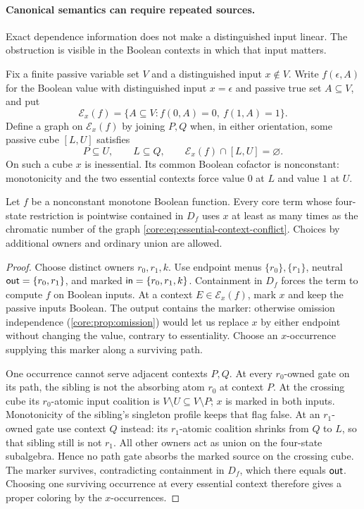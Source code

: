 \paragraph{Canonical semantics can require repeated sources.}
Exact dependence information does not make a distinguished input linear.
The obstruction is visible in the Boolean contexts in which that input
matters.

Fix a finite passive variable set $V$ and a distinguished input $x\notin V$.
Write $f(\epsilon,A)$ for the Boolean value with distinguished input
$x=\epsilon$ and passive true set $A\subseteq V$, and put
\[
 \mathcal E_x(f)=\{A\subseteq V:f(0,A)=0,\ f(1,A)=1\}.
\]
Define a graph on $\mathcal E_x(f)$ by joining $P,Q$ when, in either
orientation, some passive cube $[L,U]$ satisfies
\begin{equation}\label{core:eq:essential-context-conflict}
 P\subseteq U,\qquad L\subseteq Q,\qquad
 \mathcal E_x(f)\cap[L,U]=\varnothing.
\end{equation}
On such a cube $x$ is inessential. Its common Boolean cofactor is
nonconstant: monotonicity and the two essential contexts force value
$0$ at $L$ and value $1$ at $U$.

\begin{proposition}
\label{core:prop:essential-context-coloring}
Let $f$ be a nonconstant monotone Boolean function. Every core term whose
four-state restriction is pointwise contained in $D_f$ uses $x$ at least
as many times as the chromatic number of the graph
\eqref{core:eq:essential-context-conflict}. Choices by additional owners
and ordinary union are allowed.
\end{proposition}
\begin{proof}
Choose distinct owners $r_0,r_1,k$. Use endpoint menus
$\{r_0\},\{r_1\}$, neutral $\mathsf{out}=\{r_0,r_1\}$, and
marked $\mathsf{in}=\{r_0,r_1,k\}$. Containment in $D_f$
forces the term to compute $f$ on Boolean inputs. At a context
$E\in\mathcal E_x(f)$, mark $x$ and keep the passive inputs Boolean.
The output contains the marker: otherwise omission independence
(\cref{core:prop:omission}) would
let us replace $x$ by either endpoint without changing the value,
contrary to essentiality. Choose an $x$-occurrence supplying this marker
along a surviving path.

One occurrence cannot serve adjacent contexts $P,Q$. At every
$r_0$-owned gate on its path, the sibling is not the absorbing atom $r_0$
at context $P$. At the crossing cube its $r_0$-atomic input coalition is
$V\setminus U\subseteq V\setminus P$; $x$ is marked in both inputs.
Monotonicity of the sibling's singleton profile keeps that flag false.
At an $r_1$-owned gate use context $Q$ instead: its $r_1$-atomic coalition
shrinks from $Q$ to $L$, so that sibling still is not $r_1$.
All other owners act as union on the four-state subalgebra. Hence no
path gate absorbs the marked source on the crossing cube. The marker
survives, contradicting containment in $D_f$, which there equals $\mathsf{out}$.
Choosing one surviving occurrence at every essential context therefore
gives a proper coloring by the $x$-occurrences.
\end{proof}

